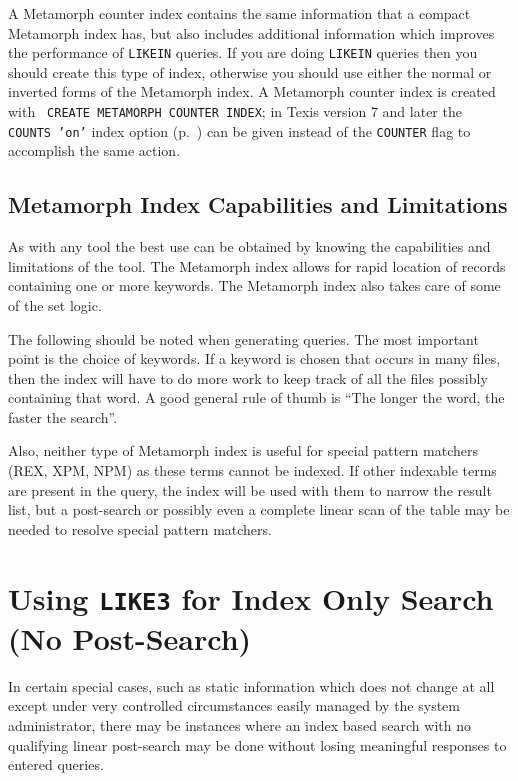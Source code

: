   A Metamorph counter index contains the same information that a
compact Metamorph index has, but also includes additional information
which improves the performance of \verb`LIKEIN` queries.  If you are
doing \verb`LIKEIN` queries then you should create this type of index,
otherwise you should use either the normal or inverted forms of the
Metamorph index.  A Metamorph counter index is created with {\tt
CREATE METAMORPH COUNTER INDEX}; in Texis version 7 and later the {\tt
COUNTS 'on'} index option (p.~\pageref{IndexOptions}) can be given
instead of the \verb`COUNTER` flag to accomplish the same action.

\subsection{Metamorph Index Capabilities and Limitations}

As with any tool the best use can be obtained by knowing the
capabilities and limitations of the tool.  The Metamorph index
allows for rapid location of records containing one or more
keywords.  The Metamorph index also takes care of some of the
set logic.

The following should be noted when generating queries.  The most
important point is the choice of keywords.  If a keyword is chosen
that occurs in many files, then the index will have to do more
work to keep track of all the files possibly containing that word.
A good general rule of thumb is ``The longer the word, the faster
the search''.

  Also, neither type of Metamorph index is useful for special
pattern matchers (REX, XPM, NPM) as these terms cannot be indexed.
If other indexable terms are present in the query, the index will
be used with them to narrow the result list, but a post-search
or possibly even a complete linear scan of the table may be needed
to resolve special pattern matchers.

\section{Using {\tt LIKE3} for Index Only Search (No Post-Search)}

In certain special cases, such as static information which does not
change at all except under very controlled circumstances easily
managed by the system administrator, there may be instances where an
index based search with no qualifying linear post-search may be done
without losing meaningful responses to entered queries.

